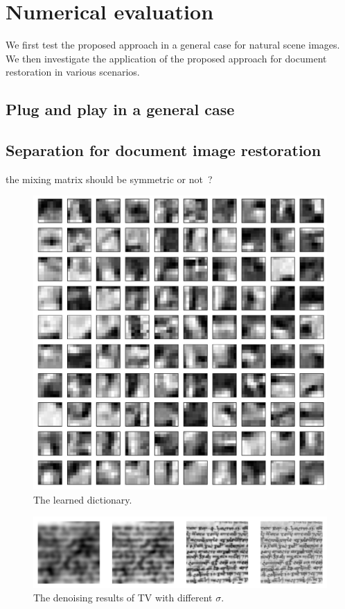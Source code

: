 \documentclass[conference]{IEEEtran}
\theoremstyle{plain}
\begin{document}
\section{Numerical evaluation}
\label{sec: xp}
We first test the proposed approach in a general case for natural scene images. We then investigate the application of the proposed approach for document restoration in various scenarios.

\subsection{Plug and play in a general case}

 
 
\subsection{Separation for document image restoration}
 the mixing matrix should be symmetric or not~\cite{tonazzini2007fast}?

 \begin{figure}[ht!]
	\centering
	\includegraphics[width=0.5\linewidth]{./fig/dictionary.pdf}
	\caption{The learned dictionary.}
	\label{fig: dictionary result}
\end{figure}


 \begin{figure}[ht!]
	\centering
	\includegraphics[width=\linewidth]{./fig/test.pdf}
	\caption{The denoising results of TV with different $\sigma$.}
	\label{fig: TV denoiser}
\end{figure}
\end{document}
